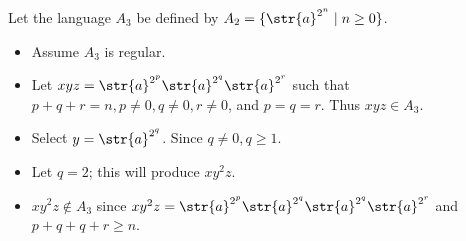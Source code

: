 Let the language $A_3$ be defined by $A_2 = \{\str{a}^{2^n} \mid n \geq 0 \}$.
\begin{itemize}
	\item Assume $A_3$ is regular.
	\item Let $xyz = \str{a}^{2^p}\str{a}^{2^q}\str{a}^{2^r}$ such that $p + q + r = n, p \neq 0, q \neq 0, r \neq 0$, and $p=q=r$. Thus $xyz \in A_3$.
	\item Select $y = \str{a}^{2^q}$. Since $q \neq 0, q \geq 1$.
	\item Let $q = 2$; this will produce $xy^2z$.
	\item $xy^2z \notin A_3$ since $xy^2z = \str{a}^{2^p}\str{a}^{2^q}\str{a}^{2^q}\str{a}^{2^r}$ and $p+q+q+r \geq n$.
\end{itemize}